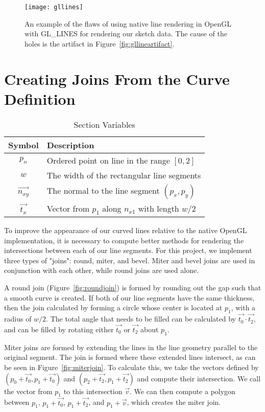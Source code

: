 \begin{figure}
\label{fig:glexample}
\texttt{[image: gllines]}
\caption[Flaws in GL\_LINES]{An example of the flaws of using native line rendering in OpenGL with GL\_LINES for rendering our sketch data. The cause of the holes is the artifact in Figure~\ref{fig:gllineartifact}.}
\end{figure}

\section{Creating Joins From the Curve Definition}

\begin{table}
\begin{center}
\begin{tabular}{|c|l|}
\hline
\textbf{Symbol} & \textbf{Description} \\ \hline
$p_n$			& Ordered point on line in the range $[0,2]$ \\
$w$				& The width of the rectangular line segments \\
$\vec{n_{xy}}$		& The normal to the line segment $(p_x, p_y)$ \\	
$\vec{t_x}$			& Vector from $p_1$ along $n_{x1}$ with length $w/2$ \\
\hline
\end{tabular}
\caption{Section Variables} \label{tab:linevariables}
\end{center}
\end{table}

To improve the appearance of our curved lines relative to the native OpenGL implementation, it is necessary to compute better methods for rendering the intersections between each of our line segments.
For this project, we implement three types of "joins": round, miter, and bevel.
Miter and bevel joins are used in conjunction with each other, while round joins are used alone.

A round join (Figure~\ref{fig:roundjoin}) is formed by rounding out the gap such that a smooth curve is created. 
If both of our line segments have the same thickness, then the join calculated by forming a circle whose center is located at $p_1$, with a radius of $w/2$. 
The total angle that needs to be filled can be calculated by $\vec{t_0} \cdot \vec{t_2}$, and can be filled by rotating either $\vec{t_0}$ or $\vec{t_2}$ about $p_1$. 

Miter joins are formed by extending the lines in the line geometry parallel to the original segment.
The join is formed where these extended lines intersect, as can be seen in Figure~\ref{fig:miterjoin}.
To calculate this, we take the vectors defined by $(p_0 + \vec{t_0}, p_1 + \vec{t_0})$ and $(p_2 + \vec{t_2}, p_1 + \vec{t_2})$ and compute their intersection. We call the vector from $p_1$ to this intersection $\vec{v}$.
We can then compute a polygon between $p_1$, $p_1 + \vec{t_0}$, $p_1 + \vec{t_2}$, and $p_1 + \vec{v}$, which creates the miter join. 


